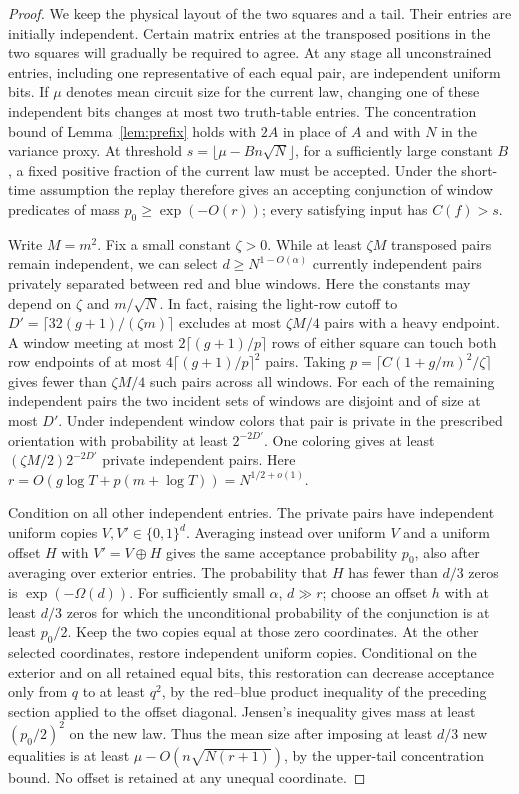 \documentclass[11pt]{article}
\begin{document}
\begin{proof}
We keep the physical layout of the two squares and a tail. Their entries are initially independent. Certain matrix entries at the transposed positions in the two squares will gradually be required to agree. At any stage all unconstrained entries, including one representative of each equal pair, are independent uniform bits. If $\mu$ denotes mean circuit size for the current law, changing one of these independent bits changes at most two truth-table entries. The concentration bound of Lemma~\ref{lem:prefix} holds with $2A$ in place of $A$ and with $N$ in the variance proxy. At threshold $s=\lfloor\mu-Bn\sqrt N\rfloor$, for a sufficiently large constant $B$, a fixed positive fraction of the current law must be accepted. Under the short-time assumption the replay therefore gives an accepting conjunction of window predicates of mass $p_0\ge\exp(-O(r))$; every satisfying input has $C(f)>s$.

Write $M=m^2$. Fix a small constant $\zeta>0$. While at least $\zeta M$ transposed pairs remain independent, we can select $d\ge N^{1-O(\alpha)}$ currently independent pairs privately separated between red and blue windows. Here the constants may depend on $\zeta$ and $m/\sqrt N$. In fact, raising the light-row cutoff to $D'=\lceil 32(g+1)/(\zeta m)\rceil$ excludes at most $\zeta M/4$ pairs with a heavy endpoint. A window meeting at most $2\lceil(g+1)/p\rceil$ rows of either square can touch both row endpoints of at most $4\lceil(g+1)/p\rceil^2$ pairs. Taking $p=\lceil C(1+g/m)^2/\zeta\rceil$ gives fewer than $\zeta M/4$ such pairs across all windows. For each of the remaining independent pairs the two incident sets of windows are disjoint and of size at most $D'$. Under independent window colors that pair is private in the prescribed orientation with probability at least $2^{-2D'}$. One coloring gives at least $(\zeta M/2)2^{-2D'}$ private independent pairs. Here $r=O(g\log T+p(m+\log T))=N^{1/2+o(1)}$.

Condition on all other independent entries. The private pairs have independent uniform copies $V,V'\in\{0,1\}^d$. Averaging instead over uniform $V$ and a uniform offset $H$ with $V'=V\oplus H$ gives the same acceptance probability $p_0$, also after averaging over exterior entries. The probability that $H$ has fewer than $d/3$ zeros is $\exp(-\Omega(d))$. For sufficiently small $\alpha$, $d\gg r$; choose an offset $h$ with at least $d/3$ zeros for which the unconditional probability of the conjunction is at least $p_0/2$. Keep the two copies equal at those zero coordinates. At the other selected coordinates, restore independent uniform copies. Conditional on the exterior and on all retained equal bits, this restoration can decrease acceptance only from $q$ to at least $q^2$, by the red--blue product inequality of the preceding section applied to the offset diagonal. Jensen's inequality gives mass at least $(p_0/2)^2$ on the new law. Thus the mean size after imposing at least $d/3$ new equalities is at least $\mu-O(n\sqrt{N(r+1)})$, by the upper-tail concentration bound. No offset is retained at any unequal coordinate.


\end{proof}
\end{document}

